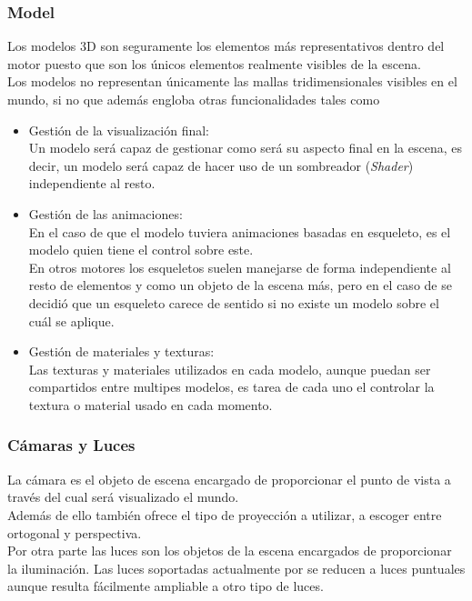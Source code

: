 \subsubsection{Model}
Los modelos 3D son seguramente los elementos más representativos dentro del motor puesto que son los únicos elementos realmente visibles de la escena.\\
Los modelos no representan únicamente las mallas tridimensionales visibles en el mundo, si no que además engloba otras funcionalidades tales como

\begin{itemize}
\item Gestión de la visualización final:\\
Un modelo será capaz de gestionar como será su aspecto final en la escena, es decir, un modelo será capaz de hacer uso de un sombreador (\textit{Shader}) independiente al resto.
\item Gestión de las animaciones:\\
En el caso de que el modelo tuviera animaciones basadas en esqueleto, es el modelo quien tiene el control sobre este.\\
En otros motores los esqueletos suelen manejarse de forma independiente al resto de elementos y como un objeto de la escena más, pero en el caso de \robotto se decidió que un esqueleto carece de sentido si no existe un modelo sobre el cuál se aplique.
\item Gestión de materiales y texturas:\\
Las texturas y materiales utilizados en cada modelo, aunque puedan ser compartidos entre multipes modelos, es tarea de cada uno el controlar la textura o material usado en cada momento.
\end{itemize}

\subsubsection{Cámaras y Luces}
La cámara es el objeto de escena encargado de proporcionar el punto de vista a través del cual será visualizado el mundo.\\
Además de ello también ofrece el tipo de proyección a utilizar, a escoger entre ortogonal y perspectiva.\\

Por otra parte las luces son los objetos de la escena encargados de proporcionar la iluminación. Las luces soportadas actualmente por \robotto se reducen a luces puntuales aunque resulta fácilmente ampliable a otro tipo de luces.\\

